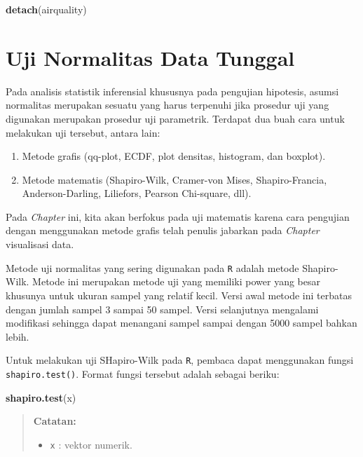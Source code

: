 \documentclass[
]{book}
\newenvironment{Shaded}{\begin{snugshade}}{\end{snugshade}}
\newcommand{\FunctionTok}[1]{\textcolor[rgb]{0.13,0.29,0.53}{\textbf{#1}}}
\newcommand{\NormalTok}[1]{#1}
\providecommand{\tightlist}{%
  \setlength{\itemsep}{0pt}\setlength{\parskip}{0pt}}
\theoremstyle{definition}
\theoremstyle{definition}
\theoremstyle{definition}
\theoremstyle{definition}
\theoremstyle{remark}
\begin{document}
\begin{Shaded}
\begin{Highlighting}[]
\FunctionTok{detach}\NormalTok{(airquality)}
\end{Highlighting}
\end{Shaded}

\hypertarget{norm}{%
\section{Uji Normalitas Data Tunggal}\label{norm}}

Pada analisis statistik inferensial khususnya pada pengujian hipotesis, asumsi normalitas merupakan sesuatu yang harus terpenuhi jika prosedur uji yang digunakan merupakan prosedur uji parametrik. Terdapat dua buah cara untuk melakukan uji tersebut, antara lain:

\begin{enumerate}
\def\labelenumi{\arabic{enumi}.}
\tightlist
\item
  Metode grafis (qq-plot, ECDF, plot densitas, histogram, dan boxplot).
\item
  Metode matematis (Shapiro-Wilk, Cramer-von Mises, Shapiro-Francia, Anderson-Darling, Liliefors, Pearson Chi-square, dll).
\end{enumerate}

Pada \emph{Chapter} ini, kita akan berfokus pada uji matematis karena cara pengujian dengan menggunakan metode grafis telah penulis jabarkan pada \emph{Chapter} visualisasi data.

Metode uji normalitas yang sering digunakan pada \texttt{R} adalah metode Shapiro-Wilk. Metode ini merupakan metode uji yang memiliki power yang besar khusunya untuk ukuran sampel yang relatif kecil. Versi awal metode ini terbatas dengan jumlah sampel 3 sampai 50 sampel. Versi selanjutnya mengalami modifikasi sehingga dapat menangani sampel sampai dengan 5000 sampel bahkan lebih.

Untuk melakukan uji SHapiro-Wilk pada \texttt{R}, pembaca dapat menggunakan fungsi \texttt{shapiro.test()}. Format fungsi tersebut adalah sebagai beriku:

\begin{Shaded}
\begin{Highlighting}[]
\FunctionTok{shapiro.test}\NormalTok{(x)}
\end{Highlighting}
\end{Shaded}

\begin{quote}
\textbf{Catatan:}

\begin{itemize}
\tightlist
\item
  \texttt{x} : vektor numerik.
\end{itemize}
\end{quote}
\end{document}
